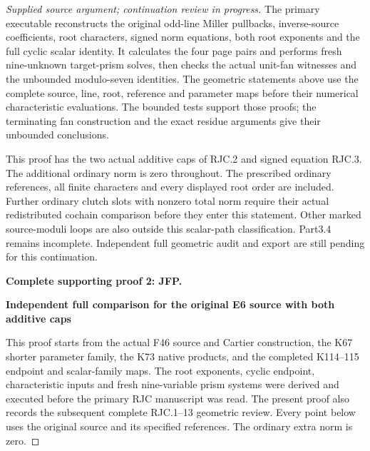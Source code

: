 \begin{proof}[Supplied source argument; continuation review in progress]
The primary executable reconstructs
the original odd-line Miller
pullbacks, inverse-source
coefficients, root characters,
signed norm equations, both
root exponents and the full
cyclic scalar identity.
It calculates the four page
pairs and performs fresh
nine-unknown target-prism solves,
then checks the actual unit-fan
witnesses and the unbounded
modulo-seven identities.
The geometric statements above
use the complete source, line,
root, reference and parameter
maps before their numerical
characteristic evaluations.
The bounded tests support those
proofs; the terminating fan
construction and the exact
residue arguments give their
unbounded conclusions.

This proof has the two actual
additive caps of RJC.2 and
signed equation RJC.3. The
additional ordinary norm is
zero throughout. The prescribed
ordinary references, all finite
characters and every displayed
root order are included.
Further ordinary clutch slots
with nonzero total norm require
their actual redistributed
cochain comparison before they
enter this statement. Other
marked source-moduli loops are
also outside this scalar-path
classification. Part3.4 remains
incomplete. Independent full
geometric audit and export are
still pending for this
continuation.



\par\bigskip\noindent\textbf{Complete supporting proof 2: JFP.}\par


\par

\medskip\noindent\textbf{Independent full comparison for the original E6 source with both additive caps}

\par\nobreak

This proof starts from the actual F46 source and Cartier construction,
the K67 shorter parameter family, the K73 native products, and the
completed K114--115 endpoint and scalar-family maps. The root exponents,
cyclic endpoint, characteristic inputs and fresh nine-variable prism
systems were derived and executed before the primary RJC manuscript
was read. The present proof also records the subsequent complete
RJC.1--13 geometric review. Every point below uses the original source
and its specified references. The ordinary extra norm is zero.

\par


\end{proof}
